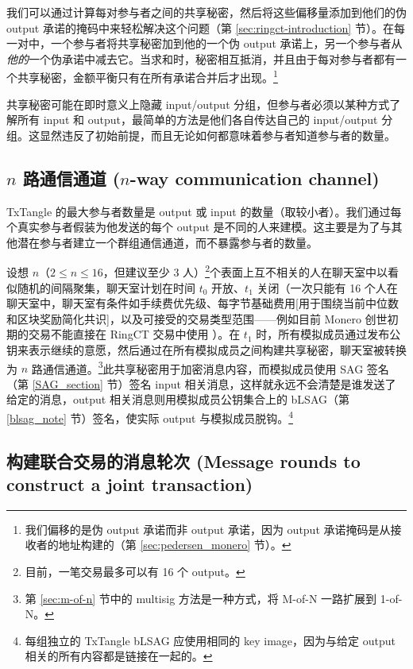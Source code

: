 我们可以通过计算每对参与者之间的共享秘密，然后将这些偏移量添加到他们的伪 output 承诺的掩码中来轻松解决这个问题（第 \ref{sec:ringct-introduction} 节）。在每一对中，一个参与者将共享秘密加到他的一个伪 output 承诺上，另一个参与者从{\em 他的}一个伪承诺中减去它。当求和时，秘密相互抵消，并且由于每对参与者都有一个共享秘密，金额平衡只有在所有承诺合并后才出现。\footnote{我们偏移的是伪 output 承诺而非 output 承诺，因为 output 承诺掩码是从接收者的地址构建的（第 \ref{sec:pedersen_monero} 节）。}

共享秘密可能在即时意义上隐藏 input/output 分组，但参与者必须以某种方式了解所有 input 和 output，最简单的方法是他们各自传达自己的 input/output 分组。这显然违反了初始前提，而且无论如何都意味着参与者知道参与者的数量。


\subsection{$n$ 路通信通道 ($n$-way communication channel)}
\label{subsec:n-way-channel}

TxTangle 的最大参与者数量是 output 或 input 的数量（取较小者）。我们通过每个真实参与者假装为他发送的每个 output 是不同的人来建模。这主要是为了与其他潜在参与者建立一个群组通信通道，而不暴露参与者的数量。

设想 $n$（$2 \leq n \leq 16$，但建议至少 3 人）\footnote{目前，一笔交易最多可以有 16 个 output。}个表面上互不相关的人在聊天室中以看似随机的间隔聚集，聊天室计划在时间 $t_0$ 开放、$t_1$ 关闭（一次只能有 16 个人在聊天室中，聊天室有条件如手续费优先级、每字节基础费用[用于围绕当前中位数和区块奖励简化共识]，以及可接受的交易类型范围——例如目前 Monero 创世初期的交易不能直接在 RingCT 交易中使用 \cite{pre-ringct-outputs-like-coinbase-research-issue-59}）。在 $t_1$ 时，所有模拟成员通过发布公钥来表示继续的意愿，然后通过在所有模拟成员之间构建共享秘密，聊天室被转换为 $n$ 路通信通道。\footnote{第 \ref{sec:m-of-n} 节中的 multisig 方法是一种方式，将 M-of-N 一路扩展到 1-of-N。}此共享秘密用于加密消息内容，而模拟成员使用 SAG 签名（第 \ref{SAG_section} 节）签名 input 相关消息，这样就永远不会清楚是谁发送了给定的消息，output 相关消息则用模拟成员公钥集合上的 bLSAG（第 \ref{blsag_note} 节）签名，使实际 output 与模拟成员脱钩。\footnote{每组独立的 TxTangle bLSAG 应使用相同的 key image，因为与给定 output 相关的所有内容都是链接在一起的。}


\subsection{构建联合交易的消息轮次 (Message rounds to construct a joint transaction)}
\label{subsec:message-rounds-txtangle}


